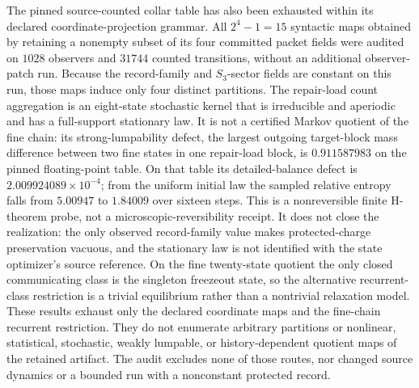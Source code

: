 \documentclass[11pt]{article}
\newcounter{none}
\begin{document}
The pinned source-counted collar table has also been exhausted within its
declared coordinate-projection grammar. All \(2^4-1=15\) syntactic maps obtained
by retaining a nonempty subset of its four committed packet fields were audited
on \(1028\) observers and \(31744\) counted transitions, without an additional
observer-patch run. Because the record-family and \(S_3\)-sector fields are
constant on this run, those maps induce only four distinct partitions. The
repair-load count aggregation is an eight-state
stochastic kernel that is irreducible and aperiodic and has a full-support
stationary law. It is not a certified Markov quotient of the fine chain: its
strong-lumpability defect, the largest outgoing target-block mass difference
between two fine states in one repair-load block, is \(0.911587983\) on the
pinned floating-point table. On that table its detailed-balance
defect is \(2.009924089\times10^{-4}\); from the uniform initial law the sampled
relative entropy falls from \(5.00947\) to \(1.84009\) over sixteen steps. This
is a nonreversible finite H-theorem probe, not a microscopic-reversibility
receipt. It does not close the realization: the only observed record-family
value makes protected-charge preservation vacuous, and the stationary law is
not identified with the state optimizer's source reference. On the fine
twenty-state quotient the only closed communicating class is the singleton
freezeout state, so the alternative recurrent-class restriction is a trivial
equilibrium rather than a nontrivial relaxation model. These results exhaust
only the declared coordinate maps and the fine-chain recurrent restriction.
They do not enumerate arbitrary partitions or nonlinear, statistical,
stochastic, weakly lumpable, or history-dependent quotient maps of the retained
artifact. The audit excludes none of those routes, nor changed source dynamics
or a bounded run with a nonconstant protected record.
\end{document}
